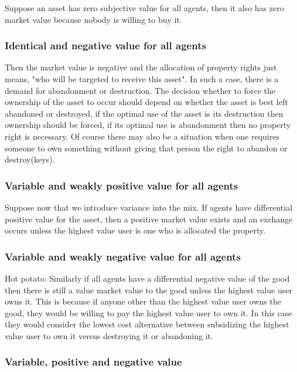 \documentclass[12pt]{article}
\numberwithin{equation}{section}
\begin{document}
Suppose an asset has zero subjective value for all agents, then it also has zero market value because nobody is willing to buy it. 

\subsubsection{Identical and negative value for all agents}

Then the market value is negative and the allocation of property rights just means,  "who will be targeted to receive this asset". In such a case, there is a demand for abandonment or destruction. The decision whether to force the ownership of the asset to occur should depend on whether the asset is best left abandoned or destroyed, if the optimal use of the asset is its destruction then ownership should be forced, if its optimal use is abandonment then no property right is necessary. Of course there may also be a situation when one requires someone to own something without giving that person the right to abandon or destroy(keys). 

\subsubsection{Variable and weakly positive value for all agents}

Suppose now that we introduce variance into the mix. If agents have differential positive value for the asset, then a positive market value exists and an exchange occurs unless the highest value user is one who is allocated the property.

\subsubsection{Variable and weakly negative value for all agents}

Hot potato: Similarly if all agents have a differential negative value of the good then there is still a value market value to the good unless the highest value user owns it. This is because if anyone other than the highest value user owns the good, they would be willing to pay the highest value user to own it. In this case they would consider the lowest cost alternative between subsidizing the highest value user to own it versus destroying it or abandoning it. 

\subsubsection{Variable, positive and negative value}
\end{document}
